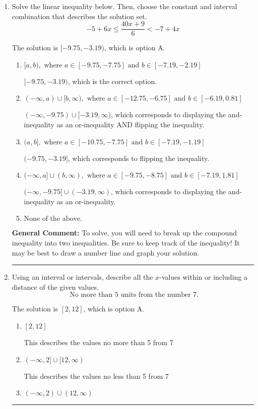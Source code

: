 \documentclass{extbook}[14pt]
\newcommand{\litem}[1]{\item #1

\rule{\textwidth}{0.4pt}}
\begin{document}
\begin{enumerate}
{\textbf{General Comment:} When multiplying or dividing by a negative, flip the sign.
}
\litem{
Solve the linear inequality below. Then, choose the constant and interval combination that describes the solution set.
\[ -5 + 6 x \leq \frac{40 x + 9}{6} < -7 + 4 x \]

The solution is \( [-9.75, -3.19) \), which is option A.\begin{enumerate}[label=\Alph*.]
\item \( [a, b), \text{ where } a \in [-9.75, -7.75] \text{ and } b \in [-7.19, -2.19] \)

$[-9.75, -3.19)$, which is the correct option.
\item \( (-\infty, a) \cup [b, \infty), \text{ where } a \in [-12.75, -6.75] \text{ and } b \in [-6.19, 0.81] \)

$(-\infty, -9.75) \cup [-3.19, \infty)$, which corresponds to displaying the and-inequality as an or-inequality AND flipping the inequality.
\item \( (a, b], \text{ where } a \in [-10.75, -7.75] \text{ and } b \in [-7.19, -1.19] \)

$(-9.75, -3.19]$, which corresponds to flipping the inequality.
\item \( (-\infty, a] \cup (b, \infty), \text{ where } a \in [-9.75, -8.75] \text{ and } b \in [-7.19, 1.81] \)

$(-\infty, -9.75] \cup (-3.19, \infty)$, which corresponds to displaying the and-inequality as an or-inequality.
\item \( \text{None of the above.} \)


\end{enumerate}

\textbf{General Comment:} To solve, you will need to break up the compound inequality into two inequalities. Be sure to keep track of the inequality! It may be best to draw a number line and graph your solution.
}
\litem{
Using an interval or intervals, describe all the $x$-values within or including a distance of the given values.
\[ \text{ No more than } 5 \text{ units from the number } 7. \]

The solution is \( [2, 12] \), which is option A.\begin{enumerate}[label=\Alph*.]
\item \( [2, 12] \)

This describes the values no more than 5 from 7
\item \( (-\infty, 2] \cup [12, \infty) \)

This describes the values no less than 5 from 7
\item \( (-\infty, 2) \cup (12, \infty) \)


\end{enumerate}}
\end{enumerate}
\end{document}
